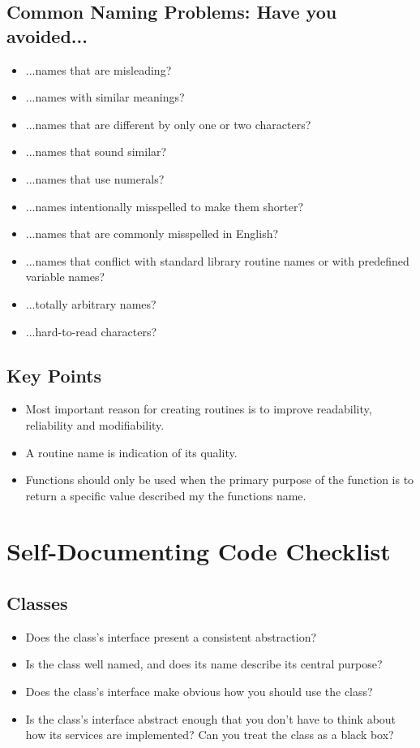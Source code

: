 \subsection{Common Naming Problems: Have you avoided...}
\begin{itemize}
\item ...names that are misleading?
\item ...names with similar meanings?
\item ...names that are different by only one or two characters?
\item ...names that sound similar?
\item ...names that use numerals?
\item ...names intentionally misspelled to make them shorter?
\item ...names that are commonly misspelled in English?
\item ...names that conflict with standard library routine names or with predefined variable names?
\item ...totally arbitrary names?
\item ...hard-to-read characters?
\end{itemize}

\subsection{Key Points}

\begin{itemize}
\item Most important reason for creating routines is to improve readability, reliability and modifiability.
\item A routine name is indication of its quality.
\item Functions should only be used when the primary purpose of the function is to return a specific value described my the functions name.
\end{itemize}

\newpage
\section{Self-Documenting Code Checklist}
\subsection{Classes}
\begin{itemize}
\item Does the class’s interface present a consistent abstraction?
\item Is the class well named, and does its name describe its central purpose? 
\item Does the class’s interface make obvious how you should use the class? 
\item Is the class’s interface abstract enough that you don’t have to think about how its services are implemented? Can you treat the class as a black box?
\end{itemize}

